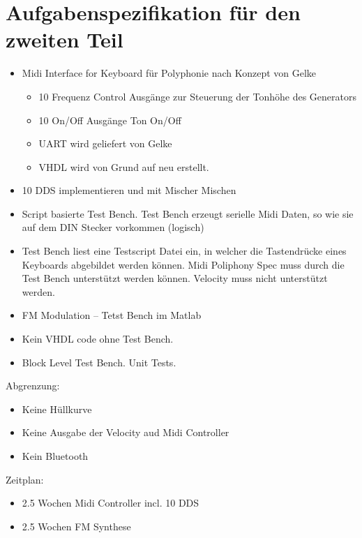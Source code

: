 \chapter{Aufgabenspezifikation für den zweiten Teil}\label{chap.anhang_aufgabenstellung_neu}

\begin{itemize}
\item Midi Interface for Keyboard für Polyphonie nach Konzept von Gelke
\begin{itemize}
    \item 10 Frequenz Control Ausgänge zur Steuerung der Tonhöhe des Generators\\
    \item 10 On/Off Ausgänge Ton On/Off\\
    \item UART wird geliefert von Gelke\\
    \item VHDL wird von Grund auf neu erstellt.
\end{itemize}
\item 10 DDS implementieren und mit Mischer Mischen
\item Script basierte Test Bench. Test Bench erzeugt serielle Midi Daten, so wie sie auf dem DIN Stecker vorkommen (logisch)
\item Test Bench liest eine Testscript Datei ein, in welcher die Tastendrücke eines Keyboards abgebildet werden können. Midi Poliphony Spec muss durch die Test Bench unterstützt werden können. Velocity muss nicht unterstützt werden.
\item FM Modulation – Tetst Bench im Matlab
\item Kein VHDL code ohne Test Bench.
\item Block Level Test Bench. Unit Tests.
\end{itemize}  

Abgrenzung:

\begin{itemize}
\item Keine Hüllkurve
\item Keine Ausgabe der Velocity aud Midi Controller
\item Kein Bluetooth
\end{itemize} 

Zeitplan:

\begin{itemize}
\item 2.5 Wochen Midi Controller incl. 10 DDS
\item 2.5 Wochen FM Synthese 
\end{itemize} 

